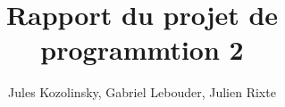 \documentclass{article}
\begin{document}
\title{Rapport du projet de programmtion 2}
\author{Jules Kozolinsky, Gabriel Lebouder, Julien Rixte}

\maketitle
\end{document}
